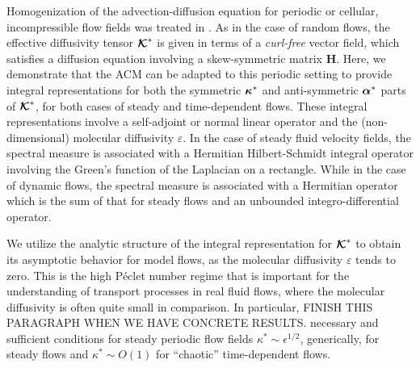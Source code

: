\documentclass[11pt]{amsart}
\newcommand{\Hb}{\mathbf{H}}
\newcommand\Kbc{\mbox{\boldmath${\mathcal{K}}$}}
\newcommand\balpha{\mbox{\boldmath${\alpha}$}}
\newcommand\bkappa{\mbox{\boldmath${\kappa}$}}
\begin{document}
Homogenization of the advection-diffusion equation for periodic or
cellular, incompressible flow fields was treated in
\cite{Fannjiang:SIAM_JAM:333,Fannjiang:1997:1033}. As in the case of
random flows, the effective diffusivity tensor
$\Kbc^*$ is given in terms of a \emph{curl-free} vector field, which
satisfies a diffusion equation involving a skew-symmetric
matrix $\Hb$. Here, we demonstrate that the ACM can
be adapted to this periodic setting to provide integral
representations for both the symmetric $\bkappa^*$ and 
anti-symmetric $\balpha^*$ parts of $\Kbc^*$, for both cases of
steady and time-dependent flows. These integral representations
involve a self-adjoint or normal linear operator and the
(non-dimensional) molecular diffusivity $\varepsilon$. In the case of steady
fluid velocity fields, the spectral measure is associated with a
Hermitian Hilbert-Schmidt integral operator involving the Green's
function of the Laplacian on a rectangle. While in the case of dynamic
flows, the spectral measure is associated with a Hermitian operator
which is the sum of that for steady flows and an unbounded
integro-differential operator.      
 

We utilize the analytic structure of the  integral
representation for $\Kbc^*$ to obtain its asymptotic behavior for
model flows, as the molecular diffusivity $\varepsilon$ tends to zero. This is
the high P\'{e}clet number regime that is important for the
understanding of transport processes in real fluid flows, where the
molecular diffusivity is often quite small in comparison. In
particular, FINISH THIS PARAGRAPH WHEN WE HAVE CONCRETE RESULTS.
necessary and sufficient conditions for steady periodic flow
fields $\kappa^*\sim\epsilon^{1/2}$, generically, for steady flows and $\kappa^*\sim O(1)$ for
``chaotic'' time-dependent flows. 

%
\end{document}
